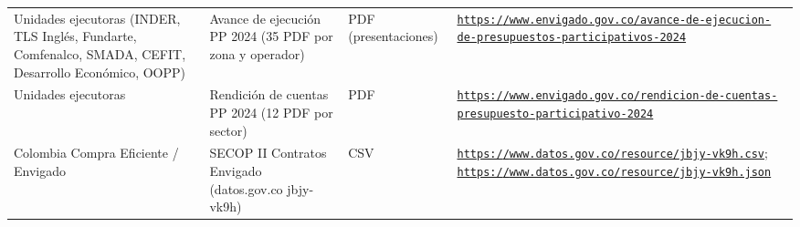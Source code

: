 \documentclass[11pt,letterpaper]{article}
\begin{document}
{\begin{xltabular}{\linewidth}{L{2.8cm}YL{1.6cm}Y}
Unidades ejecutoras (INDER, TLS Inglés, Fundarte, Comfenalco, SMADA, CEFIT, Desarrollo Económico, OOPP) & Avance de ejecución PP 2024 (35 PDF por zona y operador) & PDF (presentaciones) & \texttt{\footnotesize \href{https://www.envigado.gov.co/avance-de-ejecucion-de-presupuestos-participativos-2024}{https:/\allowbreak{}}\allowbreak{}\href{https://www.envigado.gov.co/avance-de-ejecucion-de-presupuestos-participativos-2024}{/\allowbreak{}}\allowbreak{}\href{https://www.envigado.gov.co/avance-de-ejecucion-de-presupuestos-participativos-2024}{www.\allowbreak{}envigado.\allowbreak{}gov.\allowbreak{}co/\allowbreak{}}\allowbreak{}\href{https://www.envigado.gov.co/avance-de-ejecucion-de-presupuestos-participativos-2024}{avance-\allowbreak{}de-\allowbreak{}ejecucion-\allowbreak{}de-\allowbreak{}presupuestos-\allowbreak{}participativos-\allowbreak{}2024}} \\
Unidades ejecutoras & Rendición de cuentas PP 2024 (12 PDF por sector) & PDF & \texttt{\footnotesize \href{https://www.envigado.gov.co/rendicion-de-cuentas-presupuesto-participativo-2024}{https:/\allowbreak{}}\allowbreak{}\href{https://www.envigado.gov.co/rendicion-de-cuentas-presupuesto-participativo-2024}{/\allowbreak{}}\allowbreak{}\href{https://www.envigado.gov.co/rendicion-de-cuentas-presupuesto-participativo-2024}{www.\allowbreak{}envigado.\allowbreak{}gov.\allowbreak{}co/\allowbreak{}}\allowbreak{}\href{https://www.envigado.gov.co/rendicion-de-cuentas-presupuesto-participativo-2024}{rendicion-\allowbreak{}de-\allowbreak{}cuentas-\allowbreak{}presupuesto-\allowbreak{}participativo-\allowbreak{}2024}} \\
Colombia Compra Eficiente /\allowbreak{} Envigado & SECOP II Contratos Envigado (datos.\allowbreak{}gov.\allowbreak{}co jbjy-vk9h) & CSV & \texttt{\footnotesize \href{https://www.datos.gov.co/resource/jbjy-vk9h.csv}{https:/\allowbreak{}}\allowbreak{}\href{https://www.datos.gov.co/resource/jbjy-vk9h.csv}{/\allowbreak{}}\allowbreak{}\href{https://www.datos.gov.co/resource/jbjy-vk9h.csv}{www.\allowbreak{}datos.\allowbreak{}gov.\allowbreak{}co/\allowbreak{}}\allowbreak{}\href{https://www.datos.gov.co/resource/jbjy-vk9h.csv}{resource/\allowbreak{}}\allowbreak{}\href{https://www.datos.gov.co/resource/jbjy-vk9h.csv}{jbjy-\allowbreak{}vk9h.\allowbreak{}csv}}; \newline \texttt{\footnotesize \href{https://www.datos.gov.co/resource/jbjy-vk9h.json}{https:/\allowbreak{}}\allowbreak{}\href{https://www.datos.gov.co/resource/jbjy-vk9h.json}{/\allowbreak{}}\allowbreak{}\href{https://www.datos.gov.co/resource/jbjy-vk9h.json}{www.\allowbreak{}datos.\allowbreak{}gov.\allowbreak{}co/\allowbreak{}}\allowbreak{}\href{https://www.datos.gov.co/resource/jbjy-vk9h.json}{resource/\allowbreak{}}\allowbreak{}\href{https://www.datos.gov.co/resource/jbjy-vk9h.json}{jbjy-\allowbreak{}vk9h.\allowbreak{}json}} \\

\end{xltabular}}
\end{document}
